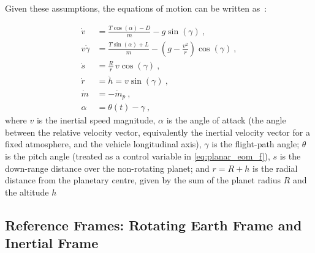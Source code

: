 Given these assumptions, the equations of motion can be written as~\cite{griffin2004space}:

\begin{subequations}\label{eq:planar_eom}
\begin{align}
  \dot{v} &= \frac{T\cos(\alpha)-D}{m} - g\sin(\gamma) \ , \label{eq:planar_eom_a}\\
  v\dot{\gamma} &= \frac{T\sin(\alpha)+L}{m} - \left(g-\frac{v^{2}}{r}\right)\cos(\gamma) \ , \label{eq:planar_eom_b}\\
  \dot{s} &= \frac{R}{r}\,v\cos(\gamma) \ , \label{eq:planar_eom_c}\\
  \dot{r} &= \dot{h} = v\sin(\gamma) \ , \label{eq:planar_eom_d}\\
  \dot{m} &= -\dot{m}_{p} \ , \label{eq:planar_eom_e}\\
  \alpha &= \theta(t)-\gamma \ , \label{eq:planar_eom_f}
\end{align}
\end{subequations}
where $v$ is the inertial speed magnitude, $\alpha$ is the angle of attack (the angle between the relative velocity vector, equivalently the inertial velocity vector for a fixed atmosphere, and the vehicle longitudinal axis), $\gamma$ is the flight-path angle; $\theta$ is the pitch angle (treated as a control variable in \eqref{eq:planar_eom_f}), $s$ is the down-range distance over the non-rotating planet; and $r=R+h$ is the radial distance from the planetary centre, given by the sum of the planet radius $R$ and the altitude $h$



\subsection{Reference Frames: Rotating Earth Frame and Inertial Frame}

